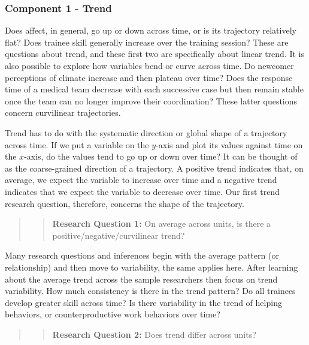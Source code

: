 \documentclass[english,,man]{apa6}
\theoremstyle{definition}
\theoremstyle{definition}
\theoremstyle{definition}
\theoremstyle{remark}
\begin{document}
\hypertarget{component-1---trend}{%
\subsubsection{Component 1 - Trend}\label{component-1---trend}}

Does affect, in general, go up or down across time, or is its trajectory
relatively flat? Does trainee skill generally increase over the training
session? These are questions about trend, and these first two are
specifically about linear trend. It is also possible to explore how
variables bend or curve across time. Do newcomer perceptions of climate
increase and then plateau over time? Does the response time of a medical
team decrease with each successive case but then remain stable once the
team can no longer improve their coordination? These latter questions
concern curvilinear trajectories.

Trend has to do with the systematic direction or global shape of a
trajectory across time. If we put a variable on the \(y\)-axis and plot
its values against time on the \(x\)-axis, do the values tend to go up
or down over time? It can be thought of as the coarse-grained direction
of a trajectory. A positive trend indicates that, on average, we expect
the variable to increase over time and a negative trend indicates that
we expect the variable to decrease over time. Our first trend research
question, therefore, concerns the shape of the trajectory.

\begin{quote}
\begin{quote}
\textbf{Research Question 1:} On average across units, is there a
positive/negative/curvilinear trend?
\end{quote}
\end{quote}

Many research questions and inferences begin with the average pattern
(or relationship) and then move to variability, the same applies here.
After learning about the average trend across the sample researchers
then focus on trend variability. How much consistency is there in the
trend pattern? Do all trainees develop greater skill across time? Is
there variability in the trend of helping behaviors, or
counterproductive work behaviors over time?

\begin{quote}
\begin{quote}
\textbf{Research Question 2:} Does trend differ across units?
\end{quote}
\end{quote}
\end{document}
